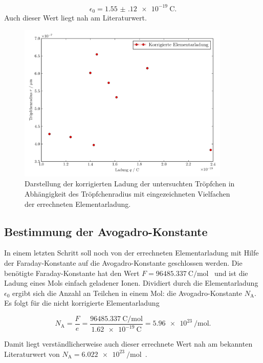 \documentclass[
  bibliography=totoc,     %
  captions=tableheading,  %
  titlepage=firstiscover, %
]{scrartcl}
\begin{document}
\begin{equation}
    \epsilon_0 = \SI{1.55(12)e-19}{\coulomb}.
\end{equation}
Auch dieser Wert liegt nah am Literaturwert.
\begin{figure}[h]
    \centering
    \includegraphics[width=0.9\textwidth]{plot_messwerte+.pdf}
    \caption{Darstellung der korrigierten Ladung der untersuchten Tröpfchen in Abhängigkeit des Tröpfchenradius mit eingezeichneten Vielfachen der errechneten Elementarladung.}
    \label{fig:messwerte+}
\end{figure}

\subsection{Bestimmung der Avogadro-Konstante}

In einem letzten Schritt soll noch von der errechneten Elementarladung mit Hilfe der Faraday-Konstante auf die Avogadro-Konstante geschlossen werden. Die benötigte Faraday-Konstante hat den Wert $F=\SI{96485.337}{\coulomb\per\mol}$~\cite{faraday} und ist die Ladung eines Mols einfach geladener Ionen. Dividiert durch die Elementarladung $\epsilon_0$ ergibt sich die Anzahl an Teilchen in einem Mol: die Avogadro-Konstante $N_{\mathup{A}}$. Es folgt für die nicht korrigierte Elementarladung

\begin{equation}
    N_{\mathup{A}}=\frac{F}{e}=\frac{\SI{96485.337}{\coulomb\per\mol}}{\SI{1.62e-19}{\coulomb}}=\SI{5.96e23}{\per\mol}.
\end{equation}

Damit liegt verständlicherweise auch dieser errechnete Wert nah am bekannten Literaturwert von $N_{\mathup{A}}=\SI{6.022e23}{\per\mol}$~\cite{avogadro}.
\end{document}
